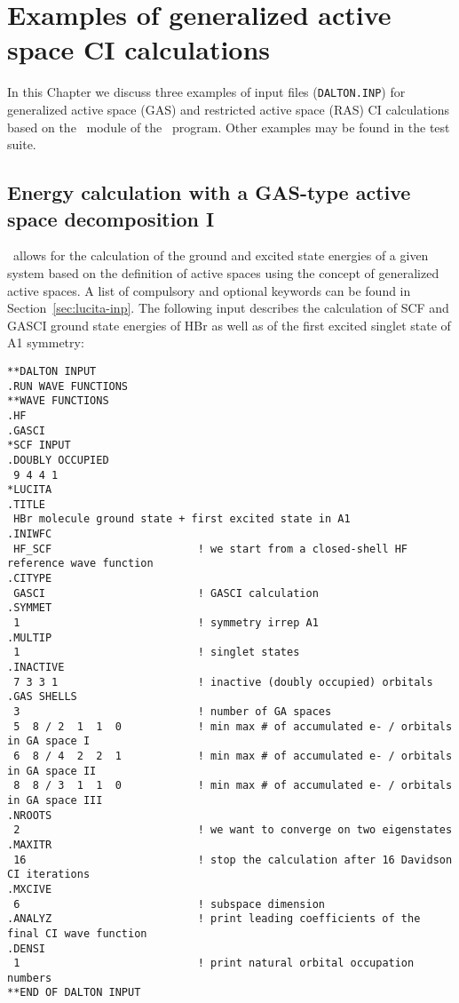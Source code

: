 \chapter{Examples of generalized active space CI calculations}
\label{ch:lucitaexamples}

In this Chapter we discuss three examples of input files (\verb|DALTON.INP|) 
for generalized active space (GAS) and restricted active space (RAS) 
CI calculations based on the \lucita\ module of the \dalton\ program. 
Other examples may be found in the test suite. 

\section{Energy calculation with a GAS-type active space decomposition I}\label{cc:lucitaex:gas1}
%
\lucita\  allows for the calculation of the ground and excited state energies
of a given system based on the definition of active spaces using the concept of generalized active spaces. 
A list of compulsory and optional keywords can be found in Section~\ref{sec:lucita-inp}. 
The following input describes the calculation of SCF and GASCI ground state energies of HBr as well as of the 
first excited singlet state of A1 symmetry:

%
\begin{verbatim}
**DALTON INPUT
.RUN WAVE FUNCTIONS
**WAVE FUNCTIONS
.HF
.GASCI
*SCF INPUT
.DOUBLY OCCUPIED
 9 4 4 1
*LUCITA
.TITLE
 HBr molecule ground state + first excited state in A1
.INIWFC
 HF_SCF                       ! we start from a closed-shell HF reference wave function
.CITYPE
 GASCI                        ! GASCI calculation
.SYMMET
 1                            ! symmetry irrep A1
.MULTIP
 1                            ! singlet states
.INACTIVE
 7 3 3 1                      ! inactive (doubly occupied) orbitals
.GAS SHELLS
 3                            ! number of GA spaces
 5  8 / 2  1  1  0            ! min max # of accumulated e- / orbitals in GA space I
 6  8 / 4  2  2  1            ! min max # of accumulated e- / orbitals in GA space II
 8  8 / 3  1  1  0            ! min max # of accumulated e- / orbitals in GA space III
.NROOTS
 2                            ! we want to converge on two eigenstates
.MAXITR
 16                           ! stop the calculation after 16 Davidson CI iterations
.MXCIVE
 6                            ! subspace dimension
.ANALYZ                       ! print leading coefficients of the final CI wave function
.DENSI
 1                            ! print natural orbital occupation numbers
**END OF DALTON INPUT
\end{verbatim}


